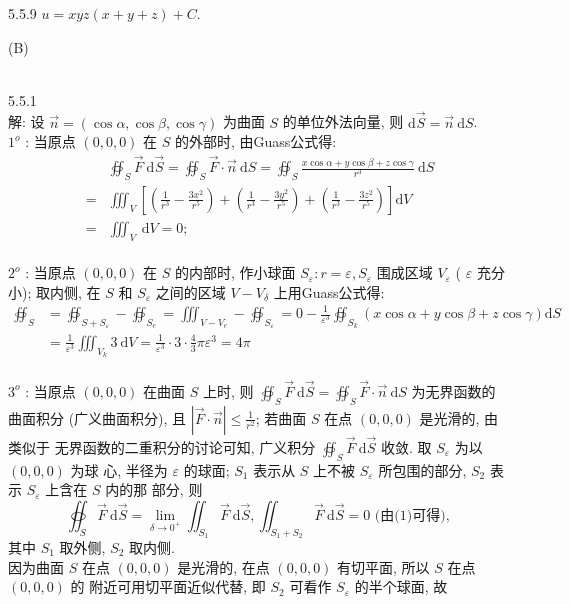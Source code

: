 \documentclass[a4paper,11pt,UTF8]{article}
\begin{document}
5.5.9 $u=x y z(x+y+z)+C$.\\
\centerline{(B)}\\
5.5.1\\
解: 设 $\vec{n}=(\cos \alpha, \cos \beta, \cos \gamma)$ 为曲面 $S$ 的单位外法向量, 则 $\mathrm{d} \vec{S}=\vec{n} \mathrm{~d} S$.\\
$1^o$ : 当原点 $(0,0,0)$ 在 $S$ 的外部时, 由Guass公式得:
$$
\begin{aligned}
	& \oiint_S \vec{F} \mathrm{~d} \vec{S}=\oiint_S \vec{F} \cdot \vec{n} \mathrm{~d} S=\oiint_S \frac{x \cos \alpha+y \cos \beta+z \cos \gamma}{r^3} \mathrm{~d} S \\
	= & \iiint_V\left[\left(\frac{1}{r^3}-\frac{3 x^2}{r^5}\right)+\left(\frac{1}{r^3}-\frac{3 y^2}{r^5}\right)+\left(\frac{1}{r^3}-\frac{3 z^2}{r^5}\right)\right] \mathrm{d} V \\
	= & \iiint_V \mathrm{~d} V=0 ;
\end{aligned}
$$\\
$2^o$ : 当原点 $(0,0,0)$ 在 $S$ 的内部时, 作小球面 $S_{\varepsilon}: r=\varepsilon, S_{\varepsilon}$ 围成区域 $V_{\varepsilon}$ ( $\varepsilon$ 充分 小); 取内侧, 在 $S$ 和 $S_{\varepsilon}$ 之间的区域 $V-V_\delta$ 上用Guass公式得:
$$
\begin{aligned}
	\oiint_S & =\oiint_{S+S_{\varepsilon}}-\oiint_{S_e}=\iiint_{V-V_e}-\oiint_{S_{\varepsilon}}=0-\frac{1}{\varepsilon^3} \oiint_{S_k}(x \cos \alpha+y \cos \beta+z \cos \gamma) \mathrm{d} S \\
	& =\frac{1}{\varepsilon^3} \iiint_{V_k} 3 \mathrm{~d} V=\frac{1}{\varepsilon^3} \cdot 3 \cdot \frac{4}{3} \pi \varepsilon^3=4 \pi
\end{aligned}
$$\\
$3^o$ : 当原点 $(0,0,0)$ 在曲面 $S$ 上时, 则 $\oiint_S \vec{F} \mathrm{~d} \vec{S}=\oiint_S \vec{F} \cdot \vec{n} \mathrm{~d} S$ 为无界函数的 曲面积分 (广义曲面积分), 且 $|\vec{F} \cdot \vec{n}| \leq \frac{1}{r^2}$; 若曲面 $S$ 在点 $(0,0,0)$ 是光滑的, 由类似于 无界函数的二重积分的讨论可知, 广义积分 $\oiint_S \vec{F} \mathrm{~d} \vec{S}$ 收敛. 取 $S_{\varepsilon}$ 为以 $(0,0,0)$ 为球 心, 半径为 $\varepsilon$ 的球面; $S_1$ 表示从 $S$ 上不被 $S_{\varepsilon}$ 所包围的部分, $S_2$ 表示 $S_{\varepsilon}$ 上含在 $S$ 内的那 部分, 则
$$
\oiint_S \vec{F} \mathrm{~d} \vec{S}=\lim _{\delta \rightarrow 0^{+}} \iint_{S_1} \vec{F} \mathrm{~d} \vec{S}, \iint_{S_1+S_2} \vec{F} \mathrm{~d} \vec{S}=0 \text { (由(1)可得), }
$$
其中 $S_1$ 取外侧, $S_2$ 取内侧.\\
因为曲面 $S$ 在点 $(0,0,0)$ 是光滑的, 在点 $(0,0,0)$ 有切平面, 所以 $S$ 在点 $(0,0,0)$ 的 附近可用切平面近似代替, 即 $S_2$ 可看作 $S_{\varepsilon}$ 的半个球面, 故
\end{document}
